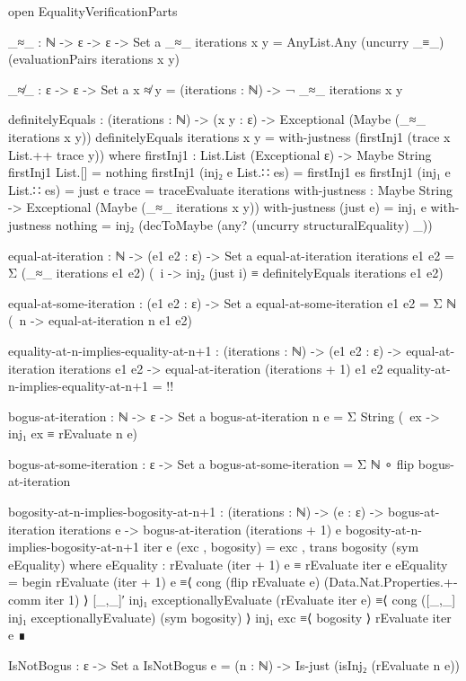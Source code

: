 \documentclass{report}
\begin{document}
\begin{code}
  open EqualityVerificationParts

  _≈_ : ℕ -> ε -> ε -> Set a
  _≈_ iterations x y = AnyList.Any (uncurry _≡_) (evaluationPairs iterations x y)

  _≉_ : ε -> ε -> Set a
  x ≉ y = (iterations : ℕ) -> ¬ _≈_ iterations x y

  definitelyEquals : (iterations : ℕ) ->
                     (x y : ε) ->
                     Exceptional (Maybe (_≈_ iterations x y))
  definitelyEquals iterations x y = with-justness (firstInj1 (trace x List.++ trace y))
    where
    firstInj1 : List.List (Exceptional ε) -> Maybe String
    firstInj1 List.[] = nothing
    firstInj1 (inj₂ e List.∷ es) = firstInj1 es
    firstInj1 (inj₁ e List.∷ es) = just e
    trace = traceEvaluate iterations
    with-justness : Maybe String ->
                    Exceptional (Maybe (_≈_ iterations x y))
    with-justness (just e) = inj₁ e
    with-justness nothing =
      inj₂ (decToMaybe (any? (uncurry structuralEquality) _))

  equal-at-iteration : ℕ -> (e1 e2 : ε) -> Set a
  equal-at-iteration iterations e1 e2 =
    Σ (_≈_ iterations e1 e2)
      (\ i -> inj₂ (just i) ≡ definitelyEquals iterations e1 e2)

  equal-at-some-iteration : (e1 e2 : ε) -> Set a
  equal-at-some-iteration e1 e2 = Σ ℕ (\ n -> equal-at-iteration n e1 e2)

  equality-at-n-implies-equality-at-n+1 :
    (iterations : ℕ) ->
    (e1 e2 : ε) ->
    equal-at-iteration iterations e1 e2 ->
    equal-at-iteration (iterations + 1) e1 e2
  equality-at-n-implies-equality-at-n+1 = {!!}

  bogus-at-iteration : ℕ -> ε -> Set a
  bogus-at-iteration n e = Σ String (\ ex -> inj₁ ex ≡ rEvaluate n e)

  bogus-at-some-iteration : ε -> Set a
  bogus-at-some-iteration = Σ ℕ ∘ flip bogus-at-iteration

  bogosity-at-n-implies-bogosity-at-n+1 :
    (iterations : ℕ) ->
    (e : ε) ->
    bogus-at-iteration iterations e ->
    bogus-at-iteration (iterations + 1) e
  bogosity-at-n-implies-bogosity-at-n+1 iter e (exc , bogosity) =
    exc , trans bogosity (sym eEquality)
    where
    eEquality : rEvaluate (iter + 1) e ≡ rEvaluate iter e
    eEquality = begin
      rEvaluate (iter + 1) e
        ≡⟨ cong (flip rEvaluate e) (Data.Nat.Properties.+-comm iter 1) ⟩
      [_,_]′ inj₁ exceptionallyEvaluate (rEvaluate iter e)
        ≡⟨ cong ([_,_] inj₁ exceptionallyEvaluate) (sym bogosity) ⟩
      inj₁ exc
        ≡⟨ bogosity ⟩
      rEvaluate iter e ∎

  IsNotBogus : ε -> Set a
  IsNotBogus e = (n : ℕ) -> Is-just (isInj₂ (rEvaluate n e))
\end{code}
\end{document}
